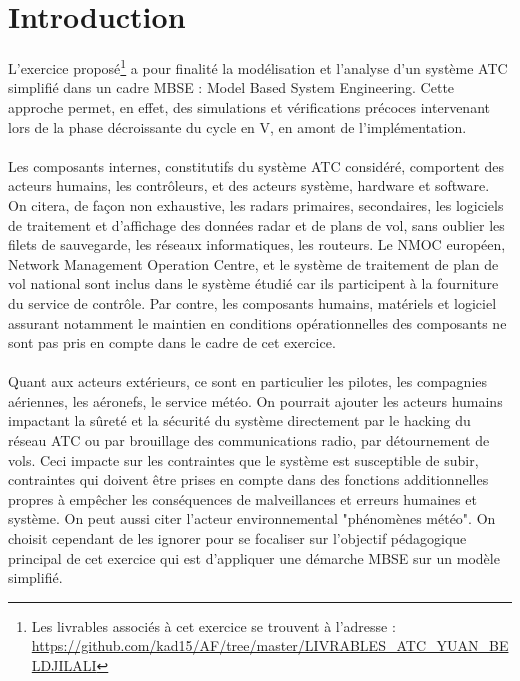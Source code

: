 
\pagebreak

\section*{Introduction}



L'exercice proposé\footnote{Les livrables associés à cet exercice se trouvent à l'adresse : 
	\url{https://github.com/kad15/AF/tree/master/LIVRABLES_ATC_YUAN_BELDJILALI}} a pour finalité la modélisation et l'analyse d'un système ATC simplifié dans un cadre MBSE : Model Based System Engineering. Cette approche permet, en effet, des simulations et vérifications précoces intervenant lors de la phase décroissante du cycle en V, en amont de l'implémentation.   



\paragraph{}
Les composants internes, constitutifs du système ATC considéré, comportent des acteurs humains, les contrôleurs, et des acteurs système, hardware et software. On citera, de façon non exhaustive, les radars primaires, secondaires, les logiciels de traitement et d'affichage des données radar et de plans de vol, sans oublier les filets de sauvegarde, les réseaux informatiques, les routeurs. Le NMOC européen, Network Management Operation Centre, et le système de traitement de plan de vol national sont inclus dans le système étudié car ils participent à la fourniture du service de contrôle. Par contre, les composants humains, matériels et logiciel assurant notamment le maintien en conditions opérationnelles des composants ne sont pas pris en compte dans le cadre de cet exercice.
\paragraph{}
Quant aux acteurs extérieurs, ce sont en particulier les pilotes, les compagnies aériennes, les aéronefs, le service météo. On pourrait ajouter les acteurs humains impactant la sûreté et la sécurité du système directement par le hacking du réseau ATC ou par brouillage des communications radio, par détournement de vols. Ceci impacte sur les contraintes que le système est susceptible de subir, contraintes qui doivent être prises en compte dans des fonctions additionnelles propres à empêcher les conséquences de malveillances et erreurs humaines et système. On peut aussi citer l'acteur environnemental "phénomènes météo". On choisit cependant de les ignorer pour se focaliser sur l'objectif pédagogique principal de cet exercice qui est d'appliquer une démarche MBSE sur un modèle simplifié.







